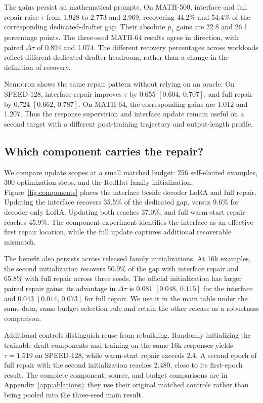 \documentclass[11pt]{article}
\newcommand{\ci}[2]{[#1,\,#2]}
\begin{document}
The gains persist on mathematical prompts. On MATH-500, interface and full repair raise $\tau$ from 1.928 to 2.773 and 2.969, recovering 44.2\% and 54.4\% of the corresponding dedicated-drafter gap. Their absolute $p_1$ gains are 22.8 and 26.1 percentage points. The three-seed MATH-64 results agree in direction, with paired $\Delta\tau$ of 0.894 and 1.074. The different recovery percentages across workloads reflect different dedicated-drafter headroom, rather than a change in the definition of recovery.

Nemotron shows the same repair pattern without relying on an oracle. On SPEED-128, interface repair improves $\tau$ by 0.655 $\ci{0.604}{0.707}$, and full repair by 0.724 $\ci{0.662}{0.787}$. On MATH-64, the corresponding gains are 1.012 and 1.207. Thus the response supervision and interface update remain useful on a second target with a different post-training trajectory and output-length profile.

\subsection{Which component carries the repair?}
We compare update scopes at a small matched budget: 256 self-elicited examples, 300 optimization steps, and the RedHat family initialization. Figure~\ref{fig:components} places the interface beside decoder LoRA and full repair. Updating the interface recovers 35.5\% of the dedicated gap, versus 9.6\% for decoder-only LoRA. Updating both reaches 37.0\%, and full warm-start repair reaches 45.9\%. The component experiment identifies the interface as an effective first repair location, while the full update captures additional recoverable mismatch.

The benefit also persists across released family initializations. At 16k examples, the second initialization recovers 50.9\% of the gap with interface repair and 65.8\% with full repair across three seeds. The official initialization has larger paired repair gains: its advantage in $\Delta\tau$ is 0.081 $\ci{0.048}{0.115}$ for the interface and 0.043 $\ci{0.014}{0.073}$ for full repair. We use it in the main table under the same-data, same-budget selection rule and retain the other release as a robustness comparison.

Additional controls distinguish reuse from rebuilding. Randomly initializing the trainable draft components and training on the same 16k responses yields $\tau=1.519$ on SPEED-128, while warm-start repair exceeds 2.4. A second epoch of full repair with the second initialization reaches 2.480, close to its first-epoch result. The complete component, source, and budget comparisons are in Appendix~\ref{app:ablations}; they use their original matched controls rather than being pooled into the three-seed main result.
\end{document}
